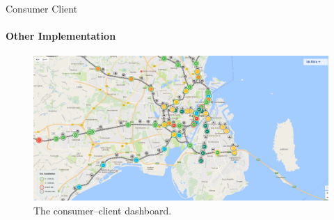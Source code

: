 \begin{frame}{Consumer Client}
    \framesubtitle{Other Implementation}

    \begin{figure}[h]
        \centering
        \includegraphics[scale=0.2]{images/RejseplanenLivemap.png}
        \caption{The consumer--client dashboard.}
    \end{figure}
\end{frame}
